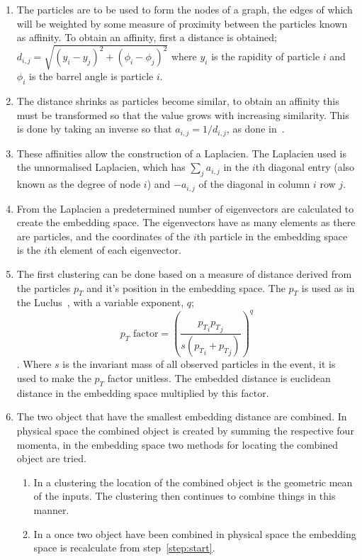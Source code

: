\begin{enumerate}
    \item \label{step:start} The particles are to be used to form the nodes of a graph,
    the edges of which will be weighted by some measure of proximity between the particles known as affinity.
    To obtain an affinity, first a distance is obtained; \(d_{i,j} = \sqrt{(y_i - y_j)^2 + (\phi_i - \phi_j)^2}\)
    where \(y_i\) is the rapidity of particle \(i\) and \(\phi_i\) is the barrel angle is particle \(i\).

    \item The distance shrinks as particles become similar, to obtain an affinity this must be transformed so that
    the value grows with increasing similarity.
    This is done by taking an inverse so that \(a_{i,j} = 1/d_{i,j}\), as done in~\cite{hadjighasem2016votex}. %

    \item These affinities allow the construction of a Laplacien.
    The Laplacien used is the unnormalised Laplacien, which has \(\sum_j a_{i,j}\) in the \(i\)th
    diagonal entry (also known as the degree of node \(i\)) and \(-a_{i,j}\) of the diagonal 
    in column \(i\) row \(j\).

    \item From the Laplacien a predetermined number of eigenvectors are calculated to create the embedding space.
    The eigenvectors have as many elements as there are particles, and the coordinates of
    the \(i\)th particle in the embedding space is the \(i\)th element of each eigenvector.

    \item The first clustering can be done based on 
    a measure of distance derived from the particles \(p_T\) and it's position in the embedding space.
    The \(p_T\) is used as in the Luclus~\cite{moretti1998new}, with a variable exponent, \(q\);
    \[p_T \text{ factor} = \left(\frac{{p_T}_i{p_T}_j}{s({p_T}_i+{p_T}_j)}\right)^q\].
    Where \(s\) is the invariant mass of all observed particles in the event, it is used
    to make the \(p_T\) factor unitless.
    The embedded distance is euclidean distance in the embedding space multiplied by this factor.

    \item The two object that have the smallest embedding distance are combined.
    In physical space the combined object is created by summing the respective four momenta,
    in the embedding space two methods for locating the combined object are tried.
    \begin{enumerate}
        \item In a \spectralmeanjet{} clustering the location of the combined object is the
        geometric mean of the inputs. The clustering then continues to combine things in this manner.
        \item In a \spectralfulljet{} once two object have been combined in physical space
            the embedding space is recalculate from step~\ref{step:start}. 
    \end{enumerate}


\end{enumerate}
